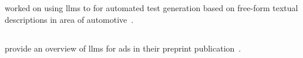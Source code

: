 \subsection{}

\citeauthor{LLMDrivenTestingADS24} worked on using \acrshort{llms} to for automated test generation
based on free-form textual descriptions in area of automotive~\cite[173]{LLMDrivenTestingADS24}.

\subsection{}

\citeauthor{requirementsAllYouNeed} provide an overview of \acrshort{llms} for \acrshort{ads} in
their preprint publication~\cite{requirementsAllYouNeed}.



